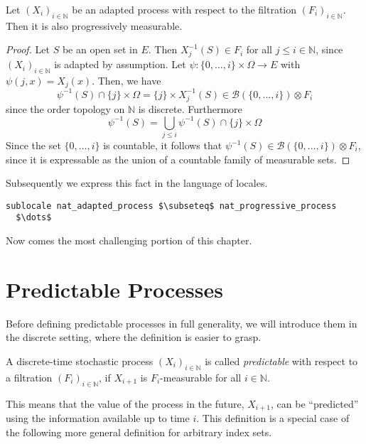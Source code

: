 \begin{lemma}
	Let $(X_i)_{i \in \mathbb{N}}$ be an adapted process with respect to the filtration $(F_i)_{i \in \mathbb{N}}$. Then it is also progressively measurable.
\end{lemma}
\begin{proof}
	Let $S$ be an open set in $E$. Then $X_j^{-1}(S) \in F_i$ for all $j \le i \in \mathbb{N}$, since $(X_i)_{i \in \mathbb{N}}$ is adapted by assumption. Let $\psi : \{0,\dots,i\} \times \Omega \rightarrow E$ with $\psi(j,x) = X_j(x)$. Then, we have
	\[
		\psi^{-1}(S) \cap \{j\} \times \Omega = \{j\} \times X_j^{-1}(S) \in \mathcal{B}(\{0,\dots,i\}) \otimes F_i
	\]
	since the order topology on $\mathbb{N}$ is discrete. Furthermore
	\[
		\psi^{-1}(S) = \bigcup_{j \le i} \psi^{-1}(S) \cap \{j\} \times \Omega 
	\]
	Since the set $\{0,\dots,i\}$ is countable, it follows that $\psi^{-1}(S) \in \mathcal{B}(\{0,\dots,i\}) \otimes F_i$, since it is expressable as the union of a countable family of measurable sets.
\end{proof}

Subsequently we express this fact in the language of locales.

\begin{isalemma}
{\small
\begin{lstlisting}[style=isabelle]
sublocale nat_adapted_process $\subseteq$ nat_progressive_process
  $\dots$
\end{lstlisting}
}
\end{isalemma}

Now comes the most challenging portion of this chapter.

\section{Predictable Processes}

Before defining predictable processes in full generality, we will introduce them in the discrete setting, where the definition is easier to grasp.

\begin{definition}
	A discrete-time stochastic process $(X_i)_{i\in\mathbb{N}}$ is called \textit{predictable} with respect to a filtration $(F_i)_{i\in\mathbb{N}}$, if $X_{i + 1}$ is $F_i$-measurable for all $i \in \mathbb{N}$.
\end{definition}

This means that the value of the process in the future, $X_{i+1}$, can be ``predicted'' using the information available up to time $i$. This definition is a special case of the following more general definition for arbitrary index sets.

